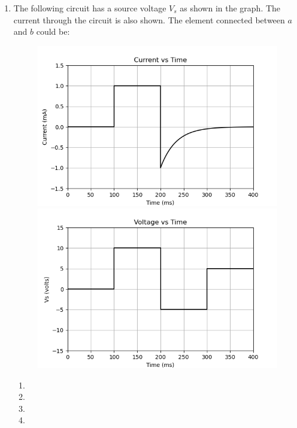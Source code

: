 \documentclass[article]{IEEEtran}
\numberwithin{figure}{enumi}
\begin{document}
\begin{enumerate}
\item The following circuit has a source voltage $V_s$ as shown in the graph. The current through the circuit is also shown. The element connected between $a$ and $b$ could be:  

\begin{figure}[ht]
\centering
    \begin{minipage}[b]{0.3\linewidth} %
        \includegraphics[width=0.9\linewidth]{graphs/Figure_1.png} %
    \end{minipage}
    \hspace{0.02\linewidth} %
    \begin{minipage}[b]{0.3\linewidth} %
        \includegraphics[width=0.9\linewidth]{graphs/Figure_2.png} %
    \end{minipage}
\end{figure}
\begin{enumerate}
\item 
\item 
\item 
\item 
\end{enumerate}




\end{enumerate}
\end{document}
